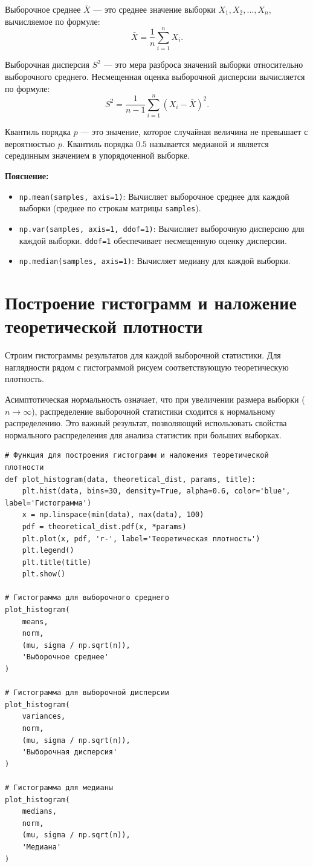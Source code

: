 \documentclass[14pt]{extreport}
\begin{document}
Выборочное среднее $\bar{X}$ --- это среднее значение выборки $X_1, X_2, \dots, X_n$, вычисляемое по формуле:
\[
\bar{X} = \frac{1}{n} \sum_{i=1}^n X_i.
\]

Выборочная дисперсия $S^2$ --- это мера разброса значений выборки относительно выборочного среднего. Несмещенная оценка выборочной дисперсии вычисляется по формуле:
\[
S^2 = \frac{1}{n-1} \sum_{i=1}^n (X_i - \bar{X})^2.
\]

Квантиль порядка $p$ --- это значение, которое случайная величина не превышает с вероятностью $p$. Квантиль порядка $0.5$ называется медианой и является серединным значением в упорядоченной выборке.

\textbf{Пояснение:}

\begin{itemize}
    \item \texttt{np.mean(samples, axis=1)}: Вычисляет выборочное среднее для каждой выборки (среднее по строкам матрицы \texttt{samples}).
    \item \texttt{np.var(samples, axis=1, ddof=1)}: Вычисляет выборочную дисперсию для каждой выборки. \texttt{ddof=1} обеспечивает несмещенную оценку дисперсии.
    \item \texttt{np.median(samples, axis=1)}: Вычисляет медиану для каждой выборки.
\end{itemize}

\section{Построение гистограмм и наложение теоретической плотности}

Строим гистограммы результатов для каждой выборочной статистики. Для наглядности рядом с гистограммой рисуем соответствующую теоретическую плотность.

Асимптотическая нормальность означает, что при увеличении размера выборки ($n \to \infty$), распределение выборочной статистики сходится к нормальному распределению. Это важный результат, позволяющий использовать свойства нормального распределения для анализа статистик при больших выборках.

\begin{verbatim}
# Функция для построения гистограмм и наложения теоретической плотности
def plot_histogram(data, theoretical_dist, params, title):
    plt.hist(data, bins=30, density=True, alpha=0.6, color='blue', label='Гистограмма')
    x = np.linspace(min(data), max(data), 100)
    pdf = theoretical_dist.pdf(x, *params)
    plt.plot(x, pdf, 'r-', label='Теоретическая плотность')
    plt.legend()
    plt.title(title)
    plt.show()

# Гистограмма для выборочного среднего
plot_histogram(
    means,
    norm,
    (mu, sigma / np.sqrt(n)),
    'Выборочное среднее'
)

# Гистограмма для выборочной дисперсии
plot_histogram(
    variances,
    norm,
    (mu, sigma / np.sqrt(n)),
    'Выборочная дисперсия'
)

# Гистограмма для медианы
plot_histogram(
    medians,
    norm,
    (mu, sigma / np.sqrt(n)),
    'Медиана'
)
\end{verbatim}
\end{document}
